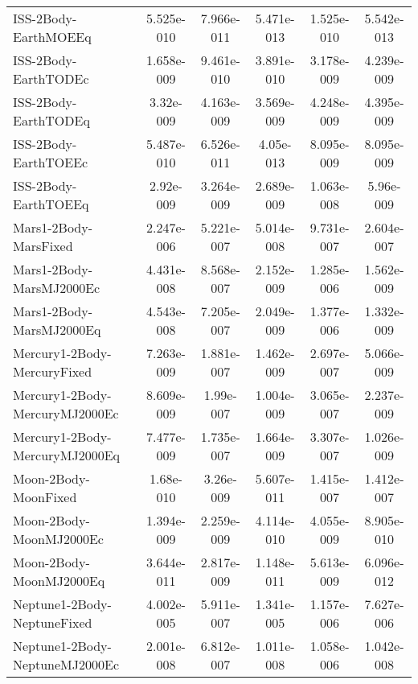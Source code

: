 \begin{table}[htbp!]
\begin{tabular}{lccccc}
         ISS-2Body-EarthMOEEq & 5.525e-010 & 7.966e-011 & 5.471e-013 & 1.525e-010 & 5.542e-013 \\
         ISS-2Body-EarthTODEc & 1.658e-009 & 9.461e-010 & 3.891e-010 & 3.178e-009 & 4.239e-009 \\
         ISS-2Body-EarthTODEq & 3.32e-009 & 4.163e-009 & 3.569e-009 & 4.248e-009 & 4.395e-009 \\
         ISS-2Body-EarthTOEEc & 5.487e-010 & 6.526e-011 & 4.05e-013 & 8.095e-009 & 8.095e-009 \\
         ISS-2Body-EarthTOEEq & 2.92e-009 & 3.264e-009 & 2.689e-009 & 1.063e-008 & 5.96e-009 \\
         Mars1-2Body-MarsFixed & 2.247e-006 & 5.221e-007 & 5.014e-008 & 9.731e-007 & 2.604e-007 \\
         Mars1-2Body-MarsMJ2000Ec & 4.431e-008 & 8.568e-007 & 2.152e-009 & 1.285e-006 & 1.562e-009 \\
         Mars1-2Body-MarsMJ2000Eq & 4.543e-008 & 7.205e-007 & 2.049e-009 & 1.377e-006 & 1.332e-009 \\
         Mercury1-2Body-MercuryFixed & 7.263e-009 & 1.881e-007 & 1.462e-009 & 2.697e-007 & 5.066e-009 \\
         Mercury1-2Body-MercuryMJ2000Ec & 8.609e-009 & 1.99e-007 & 1.004e-009 & 3.065e-007 & 2.237e-009 \\
         Mercury1-2Body-MercuryMJ2000Eq & 7.477e-009 & 1.735e-007 & 1.664e-009 & 3.307e-007 & 1.026e-009 \\
         Moon-2Body-MoonFixed & 1.68e-010 & 3.26e-009 & 5.607e-011 & 1.415e-007 & 1.412e-007 \\
         Moon-2Body-MoonMJ2000Ec & 1.394e-009 & 2.259e-009 & 4.114e-010 & 4.055e-009 & 8.905e-010 \\
         Moon-2Body-MoonMJ2000Eq & 3.644e-011 & 2.817e-009 & 1.148e-011 & 5.613e-009 & 6.096e-012 \\
         Neptune1-2Body-NeptuneFixed & 4.002e-005 & 5.911e-007 & 1.341e-005 & 1.157e-006 & 7.627e-006 \\
         Neptune1-2Body-NeptuneMJ2000Ec & 2.001e-008 & 6.812e-007 & 1.011e-008 & 1.058e-006 & 1.042e-008 \\

\end{tabular}
\end{table}
